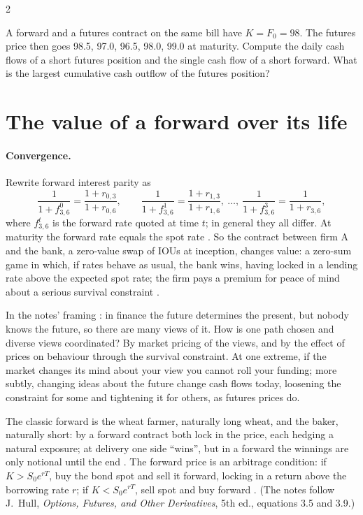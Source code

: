 \begin{paracol}{2}
\begin{exercise}
A forward and a futures contract on the same bill have $K=F_0=98$. The futures price then goes 98.5, 97.0, 96.5, 98.0, 99.0 at maturity. Compute the daily cash
flows of a short futures position and the single cash flow of a short forward. What is the largest cumulative cash outflow of the futures position?
\end{exercise}

\section{The value of a forward over its life}\label{sec:ff-value}

\paragraph{Convergence.} Rewrite forward interest parity as 
\[
  \frac{1}{1+f^{0}_{3,6}} = \frac{1+r_{0,3}}{1+r_{0,6}}, \qquad \frac{1}{1+f^{1}_{3,6}} = \frac{1+r_{1,3}}{1+r_{1,6}},\ \ldots,\ \frac{1}{1+f^{3}_{3,6}} = \frac{1}{1+r_{3,6}},
\]
where $f^{t}_{3,6}$ is the forward rate quoted at time $t$; in general they all differ. At maturity the forward rate equals the spot rate
. So the contract between firm A and the bank, a zero-value swap of
IOUs at inception, changes value: a zero-sum game in which, if rates behave as usual, the bank wins, having locked in a lending rate above the expected spot rate;
the firm pays a premium for peace of mind about a serious survival constraint .

\begin{intuition}
In the notes' framing : in finance the future determines the present, but nobody knows the future, so there are many views of it. How is one path chosen and diverse views
coordinated? By market pricing of the views, and by the effect of prices on behaviour through the survival constraint. At one extreme, if the market changes its mind about your view you
cannot roll your funding; more subtly, changing ideas about the future change cash flows today, loosening the constraint for some and tightening it for others, as futures prices do.
\end{intuition}

The classic forward is the wheat farmer, naturally long wheat, and the baker, naturally short: by a forward contract both lock in the price, each hedging a natural exposure; at delivery one
side ``wins'', but in a forward the winnings are only notional until the end . The forward price is an arbitrage condition: if $K>S_0e^{rT}$, buy the bond spot and sell it forward,
locking in a return above the borrowing rate $r$; if $K<S_0e^{rT}$, sell spot and buy forward . (The notes follow J.~Hull, \emph{Options, Futures, and Other Derivatives}, 5th ed.,
equations 3.5 and 3.9.)


\end{paracol}
